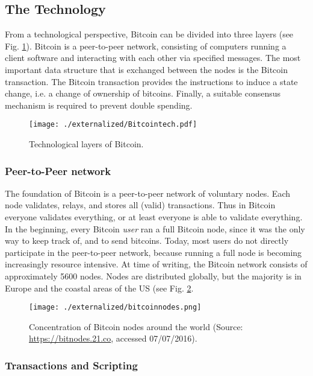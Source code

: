 \subsection{The Technology}
\label{sec:btc_tech}

From a technological perspective, Bitcoin can be divided into three layers (see Fig. \ref{fig:btclayers}). Bitcoin is a peer-to-peer network, consisting of computers running a client software and interacting with each other via specified messages. The most important data structure that is exchanged between the nodes is the Bitcoin transaction. The Bitcoin transaction provides the instructions to induce a state change, i.e. a change of ownership of bitcoins. Finally, a suitable consensus mechanism is required to prevent double spending. 

\begin{figure}
\centering
\texttt{[image: ./externalized/Bitcointech.pdf]}
\caption{Technological layers of Bitcoin.}
\label{fig:btclayers}
\end{figure}


\subsubsection{Peer-to-Peer network}
\label{sec:p2p}

The foundation of Bitcoin is a peer-to-peer network of voluntary nodes. Each node validates, relays, and stores all (valid) transactions. Thus in Bitcoin everyone validates everything, or at least everyone is able to validate everything. In the beginning, every Bitcoin \emph{user} ran a full Bitcoin node, since it was the only way to keep track of, and to send bitcoins. Today, most users do not directly participate in the peer-to-peer network, because running a full node is becoming increasingly resource intensive. At time of writing, the Bitcoin network consists of approximately 5600 nodes. Nodes are distributed globally, but the majority is in Europe and the coastal areas of the US (see Fig. \ref{fig:bitcoinnodes}. 

\begin{figure}
\centering
\texttt{[image: ./externalized/bitcoinnodes.png]}
\caption{Concentration of Bitcoin nodes around the world (Source: \url{https://bitnodes.21.co}, accessed 07/07/2016).}
\label{fig:bitcoinnodes}
\end{figure}


\subsubsection{Transactions and Scripting}
\label{sec:tx}

